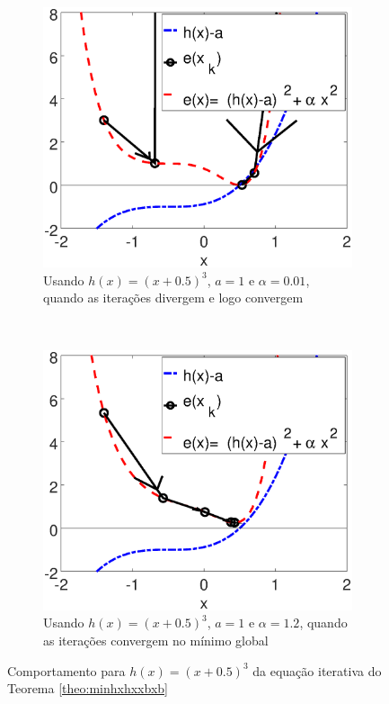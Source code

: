 \begin{figure}[!h]
    \centering
    \begin{subfigure}[b]{0.49\textwidth}
        \includegraphics[width=\textwidth]{chapters/minimization-hx/mfiles/hx3_a_alphax/minimizando_hx_a_alphax_1.eps}
        \caption{Usando $h(x)=(x+0.5)^3$, $a=1$ e $\alpha=0.01$, quando as iterações divergem e logo convergem}
        \label{fig:hx3bcasesa}
    \end{subfigure}
    ~ %
    \begin{subfigure}[b]{0.49\textwidth}
        \includegraphics[width=\textwidth]{chapters/minimization-hx/mfiles/hx3_a_alphax/minimizando_hx_a_alphax_2.eps}
        \caption{Usando $h(x)=(x+0.5)^3$, $a=1$ e $\alpha=1.2$, quando as iterações convergem no mínimo global}
        \label{fig:hx3bcasesb}
    \end{subfigure}
    \caption{Comportamento para $h(x)=(x+0.5)^3$ da equação iterativa do Teorema \ref{theo:minhxhxxbxb}}
    \label{fig:hx3bcases}
\end{figure}
